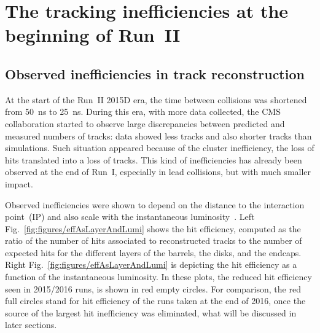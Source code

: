 
\clearpage

\setcounter{secnumdepth}{4}
\setcounter{secnumdepth}{4}


\section{The tracking inefficiencies at the beginning of Run~II~\label{sec:hitIneff}}

\subsection{Observed inefficiencies in track reconstruction}

At the start of the Run~II 2015D era, the time between collisions was shortened from 50~ns to 25~ns. During this era, with more data collected, the CMS collaboration started to observe large discrepancies between predicted and measured numbers of tracks: data showed less tracks and also shorter tracks than simulations. Such situation appeared because of the cluster inefficiency, the loss of hits translated into a loss of tracks. This kind of inefficiencies has already been observed at the end of Run~I, especially in lead collisions, but with much smaller impact. 

Observed inefficiencies were shown to depend on the distance to the interaction point~(IP) and also scale with the instantaneous luminosity~\cite{website:hitEff}. Left Fig.~\ref{fig:figures/effAsLayerAndLumi} shows the hit efficiency, computed as the ratio of the number of hits associated to reconstructed tracks to the number of expected hits for the different layers of the barrels, the disks, and the endcaps. Right Fig.~\ref{fig:figures/effAsLayerAndLumi} is depicting the hit efficiency  as a function of the instantaneous luminosity. In these plots, the reduced hit efficiency seen in 2015/2016 runs, is shown in red empty circles. For comparison, the red full circles stand for hit efficiency of the runs taken at the end of 2016, once the source of the largest hit inefficiency was eliminated, what will be discussed in later sections.


